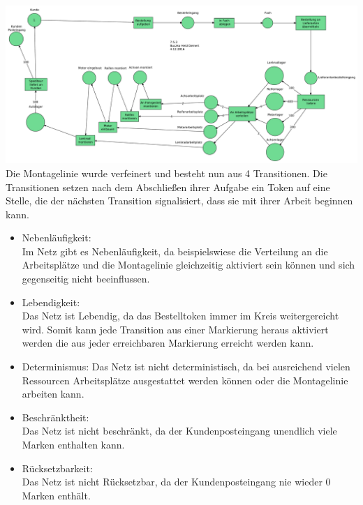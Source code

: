 \documentclass[a4paper,12pt]{scrartcl}
\begin{document}
\subsubsection{}
\includegraphics[scale=0.3]{G-6-A-07-Netz4-Buczko_Heid_Deinert.pdf}\\
Die Montagelinie wurde verfeinert und besteht nun aus 4 Transitionen.
Die Transitionen setzen nach dem Abschließen ihrer Aufgabe ein Token auf eine Stelle, die der nächsten Transition
signalisiert, dass sie mit ihrer Arbeit beginnen kann.
\begin{itemize}
  \item{Nebenläufigkeit:}\\
  Im Netz gibt es Nebenläufigkeit, da beispielswiese die Verteilung an die Arbeitsplätze und die Montagelinie gleichzeitig aktiviert sein können und sich gegenseitig nicht beeinflussen.
  \item{Lebendigkeit:}\\
  Das Netz ist Lebendig, da das Bestelltoken immer im Kreis weitergereicht wird. Somit kann jede Transition aus einer Markierung heraus aktiviert werden die aus jeder erreichbaren Markierung erreicht werden kann.
  \item{Determinismus:}
  Das Netz ist nicht deterministisch, da bei ausreichend vielen Ressourcen Arbeitsplätze ausgestattet werden können oder die Montagelinie arbeiten kann.
  \item{Beschränktheit:}\\
  Das Netz ist nicht beschränkt, da der Kundenposteingang unendlich viele Marken enthalten kann.
  \item{Rücksetzbarkeit:}\\
  Das Netz ist nicht Rücksetzbar, da der Kundenposteingang nie wieder 0 Marken enthält.
\end{itemize}

\end{document}

